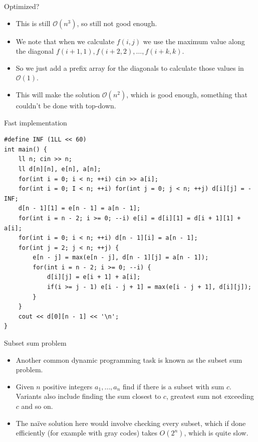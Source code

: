 \documentclass{beamer}
\begin{document}
\begin{frame}[plain]{Optimized?}
    \begin{itemize}
        \item This is still $\mathcal{O}(n^3)$, so still not good enough.
        \item We note that when we calculate $f(i, j)$ we use the maximum value along the diagonal $f(i + 1, 1), f(i + 2, 2), \dots, f(i + k, k)$.
        \item So we just add a prefix array for the diagonals to calculate those values in $\mathcal{O}(1)$.
        \item This will make the solution $\mathcal{O}(n^2)$, which is good enough, something that couldn't be done with top-down.
    \end{itemize}
\end{frame}

\begin{frame}{Fast implementation}
\scriptsize
\begin{verbatim}
#define INF (1LL << 60)
int main() {
    ll n; cin >> n;
    ll d[n][n], e[n], a[n];
    for(int i = 0; i < n; ++i) cin >> a[i];
    for(int i = 0; I < n; ++i) for(int j = 0; j < n; ++j) d[i][j] = -INF;
    d[n - 1][1] = e[n - 1] = a[n - 1];
    for(int i = n - 2; i >= 0; --i) e[i] = d[i][1] = d[i + 1][1] + a[i];
    for(int i = 0; i < n; ++i) d[n - 1][i] = a[n - 1];
    for(int j = 2; j < n; ++j) {
        e[n - j] = max(e[n - j], d[n - 1][j] = a[n - 1]);
        for(int i = n - 2; i >= 0; --i) {
            d[i][j] = e[i + 1] + a[i];
            if(i >= j - 1) e[i - j + 1] = max(e[i - j + 1], d[i][j]);
        }
    }
    cout << d[0][n - 1] << '\n';
}
\end{verbatim}
\end{frame}

\begin{frame}[plain]{Subset sum problem}
    \vspace{10pt}

    \begin{itemize}
        \item Another common dynamic programming task is known as the subset sum problem. 
        
        \item Given $n$ positive integers $a_1, \dots, a_n$ find if there is a subset with sum $c$. Variants also include finding the sum closest to $c$, greatest sum not exceeding $c$ and so on.
        
        \item The naïve solution here would involve checking every subset, which if done efficiently (for example with gray codes) takes $O(2^n)$, which is quite slow.
    \end{itemize}
\end{frame}
\end{document}
